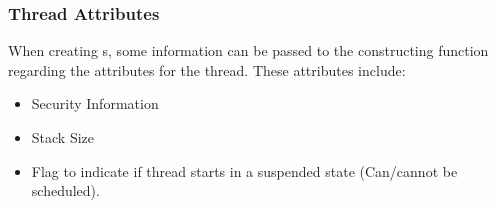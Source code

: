 \subsubsection{Thread Attributes}\label{subsubsec:Thread_Attributes}
When creating s, some information can be passed to the constructing function regarding the attributes for the thread.
These attributes include:
\begin{itemize}[noitemsep]
\item Security Information
\item Stack Size
\item Flag to indicate if thread starts in a suspended state (Can/cannot be scheduled).
\end{itemize}

